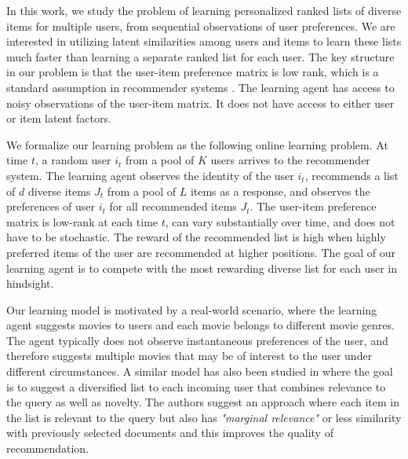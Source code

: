 
In this work, we study the problem of learning personalized ranked lists of diverse items for multiple users, from sequential observations of user preferences. We are interested in utilizing latent similarities among users and items to learn these lists much faster than learning a separate ranked list for each user. The key structure in our problem is that the user-item preference matrix is low rank, which is a standard assumption in recommender systems \citep{koren2009matrix,ricci2011liorrokach}. The learning agent has access to noisy observations of the user-item matrix. It does not have access to either user or item latent factors.

We formalize our learning problem as the following online learning problem. At time $t$, a random user $i_t$ from a pool of $K$ users arrives to the recommender system. The learning agent observes the identity of the user $i_t$, recommends a list of $d$ diverse items $J_t$ from a pool of $L$ items as a response, and observes the preferences of user $i_t$ for all recommended items $J_t$. The user-item preference matrix is low-rank at each time $t$, can vary substantially over time, and does not have to be stochastic. The reward of the recommended list is high when highly preferred items of the user are recommended at higher positions. The goal of our learning agent is to compete with the most rewarding diverse list for each user in hindsight.

Our learning model is motivated by a real-world scenario, where the learning agent suggests movies to users and each movie belongs to different movie genres. The agent typically does not observe instantaneous preferences of the user, and therefore suggests multiple movies that may be of interest to the user under different circumstances. A similar model has also been studied in \citet{carbonell1998use} where the goal is to suggest a diversified list to each incoming user that combines relevance to the query as well as novelty. The authors suggest an approach where each item in the list is relevant to the query but also has \textit{"marginal relevance"} or less similarity with previously selected documents and this improves the quality of recommendation.


%

